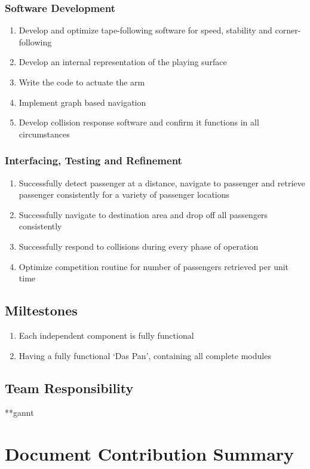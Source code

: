 \documentclass[12pt]{article}
\begin{document}
\subsubsection{Software Development}
\begin{enumerate}
\item Develop and optimize tape-following software for speed, stability and
  corner-following 
\item Develop an internal representation of the playing surface
\item Write the code to actuate the arm
\item Implement graph based navigation
\item Develop collision response software and confirm it functions in all
circumstances
\end{enumerate}
\subsubsection{Interfacing, Testing and Refinement}
\begin{enumerate}
  \item Successfully detect passenger at a distance, navigate to passenger and
  retrieve passenger consistently for a variety of passenger locations 
  \item Successfully navigate to destination area and drop off all passengers
  consistently 
  \item Successfully respond to collisions during every phase of operation
\item Optimize competition routine for number of passengers retrieved per unit
time
\end{enumerate}
\subsection{Miltestones}
\begin{enumerate}
  \item Each independent component is fully functional
 \item Having a fully functional ‘Das Pan’, containing all complete modules
\end{enumerate}
\subsection{Team Responsibility}
**gannt
\section{Document Contribution Summary}
\end{document}
